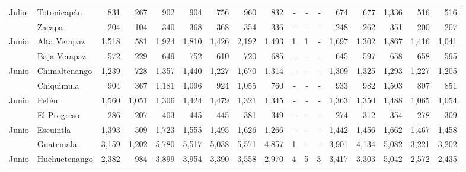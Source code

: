 \begin{landscape}
\begin{center}
\begin{longtable}{llrrrrrrrrrrrrrrr}
\multicolumn{1}{l}{	\footnotesize	 Julio 	}&	 Totonicapán 	&	 831 	&	 267 	&	 902 	&	 904 	&	 756 	&	 960 	&	 832 	&	 -   	&	 -   	&	 -   	&	 674 	&	 677 	&	 1,336 	&	 516 	&	 516 	\\
\rowcolor{color1!5!white}\multicolumn{1}{l}{	\footnotesize	 Julio 	}&	 Zacapa 	&	 204 	&	 104 	&	 340 	&	 368 	&	 368 	&	 354 	&	 336 	&	 -   	&	 -   	&	 -   	&	 248 	&	 262 	&	 351 	&	 200 	&	 207 	\\
\multicolumn{1}{l}{	\footnotesize	 Junio 	}&	 Alta Verapaz 	&	 1,518 	&	 581 	&	 1,924 	&	 1,810 	&	 1,426 	&	 2,192 	&	 1,493 	&	 1 	&	 1 	&	 -   	&	 1,697 	&	 1,302 	&	 1,867 	&	 1,416 	&	 1,041 	\\
\rowcolor{color1!5!white}\multicolumn{1}{l}{	\footnotesize	 Junio 	}&	 Baja Verapaz 	&	 572 	&	 229 	&	 649 	&	 752 	&	 610 	&	 720 	&	 685 	&	 -   	&	 -   	&	 -   	&	 645 	&	 597 	&	 658 	&	 658 	&	 595 	\\
\multicolumn{1}{l}{	\footnotesize	 Junio 	}&	 Chimaltenango 	&	 1,239 	&	 728 	&	 1,357 	&	 1,440 	&	 1,227 	&	 1,670 	&	 1,314 	&	 -   	&	 -   	&	 -   	&	 1,309 	&	 1,325 	&	 1,293 	&	 1,227 	&	 1,205 	\\
\rowcolor{color1!5!white}\multicolumn{1}{l}{	\footnotesize	 Junio 	}&	 Chiquimula 	&	 904 	&	 367 	&	 1,181 	&	 1,096 	&	 924 	&	 1,055 	&	 760 	&	 -   	&	 -   	&	 -   	&	 933 	&	 982 	&	 1,503 	&	 807 	&	 851 	\\
\multicolumn{1}{l}{	\footnotesize	 Junio 	}&	 Petén 	&	 1,560 	&	 1,051 	&	 1,306 	&	 1,424 	&	 1,479 	&	 1,321 	&	 1,345 	&	 -   	&	 -   	&	 -   	&	 1,363 	&	 1,350 	&	 1,488 	&	 1,065 	&	 1,054 	\\
\rowcolor{color1!5!white}\multicolumn{1}{l}{	\footnotesize	 Junio 	}&	 El Progreso 	&	 286 	&	 207 	&	 403 	&	 445 	&	 445 	&	 381 	&	 349 	&	 -   	&	 -   	&	 -   	&	 274 	&	 312 	&	 354 	&	 278 	&	 309 	\\
\multicolumn{1}{l}{	\footnotesize	 Junio 	}&	 Escuintla 	&	 1,393 	&	 509 	&	 1,723 	&	 1,555 	&	 1,495 	&	 1,626 	&	 1,266 	&	 -   	&	 -   	&	 -   	&	 1,442 	&	 1,456 	&	 1,662 	&	 1,467 	&	 1,458 	\\
\rowcolor{color1!5!white}\multicolumn{1}{l}{	\footnotesize	 Junio 	}&	 Guatemala 	&	 3,159 	&	 1,202 	&	 5,780 	&	 5,517 	&	 5,038 	&	 5,571 	&	 4,857 	&	 1 	&	 -   	&	 -   	&	 3,901 	&	 4,134 	&	 5,082 	&	 3,221 	&	 3,202 	\\
\multicolumn{1}{l}{	\footnotesize	 Junio 	}&	 Huehuetenango 	&	 2,382 	&	 984 	&	 3,899 	&	 3,954 	&	 3,390 	&	 3,558 	&	 2,970 	&	 4 	&	 5 	&	 3 	&	 3,417 	&	 3,303 	&	 5,042 	&	 2,572 	&	 2,435 	\\

\end{longtable}
\end{center}
\end{landscape}
